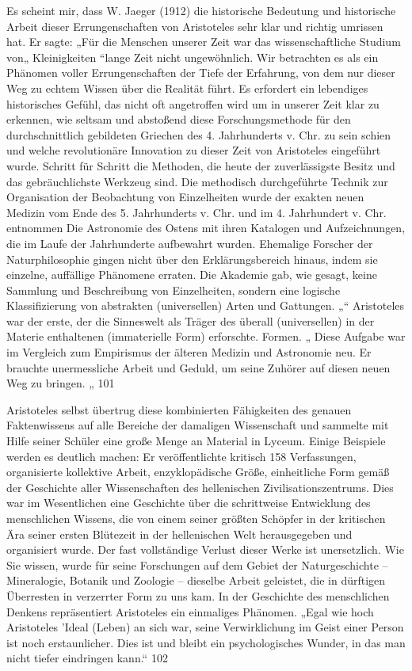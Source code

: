 \documentclass[11pt,a4paper]{book}
\begin{document}
Es scheint mir, dass W. Jaeger (1912) die historische Bedeutung und historische Arbeit dieser Errungenschaften von Aristoteles sehr klar und richtig umrissen hat. Er sagte: „Für die Menschen unserer Zeit war das wissenschaftliche Studium von„ Kleinigkeiten “lange Zeit nicht ungewöhnlich. Wir betrachten es als ein Phänomen voller Errungenschaften der Tiefe der Erfahrung, von dem nur dieser Weg zu echtem Wissen über die Realität führt. Es erfordert ein lebendiges historisches Gefühl, das nicht oft angetroffen wird um in unserer Zeit klar zu erkennen, wie seltsam und abstoßend diese Forschungsmethode für den durchschnittlich gebildeten Griechen des 4. Jahrhunderts v. Chr. zu sein schien und welche revolutionäre Innovation zu dieser Zeit von Aristoteles eingeführt wurde. Schritt für Schritt die Methoden, die heute der zuverlässigste Besitz und das gebräuchlichste Werkzeug sind. Die methodisch durchgeführte Technik zur Organisation der Beobachtung von Einzelheiten wurde der exakten neuen Medizin vom Ende des 5. Jahrhunderts v. Chr. und im 4. Jahrhundert v. Chr. entnommen Die Astronomie des Ostens mit ihren Katalogen und Aufzeichnungen, die im Laufe der Jahrhunderte aufbewahrt wurden. Ehemalige Forscher der Naturphilosophie gingen nicht über den Erklärungsbereich hinaus, indem sie einzelne, auffällige Phänomene erraten. Die Akademie gab, wie gesagt, keine Sammlung und Beschreibung von Einzelheiten, sondern eine logische Klassifizierung von abstrakten (universellen) Arten und Gattungen. „“ Aristoteles war der erste, der die Sinneswelt als Träger des überall (universellen) in der Materie enthaltenen (immaterielle Form) erforschte. Formen. „ Diese Aufgabe war im Vergleich zum Empirismus der älteren Medizin und Astronomie neu. Er brauchte unermessliche Arbeit und Geduld, um seine Zuhörer auf diesen neuen Weg zu bringen. „ 101



Aristoteles selbst übertrug diese kombinierten Fähigkeiten des genauen Faktenwissens auf alle Bereiche der damaligen Wissenschaft und sammelte mit Hilfe seiner Schüler eine große Menge an Material in Lyceum. Einige Beispiele werden es deutlich machen: Er veröffentlichte kritisch 158 Verfassungen, organisierte kollektive Arbeit, enzyklopädische Größe, einheitliche Form gemäß der Geschichte aller Wissenschaften des hellenischen Zivilisationszentrums. Dies war im Wesentlichen eine Geschichte über die schrittweise Entwicklung des menschlichen Wissens, die von einem seiner größten Schöpfer in der kritischen Ära seiner ersten Blütezeit in der hellenischen Welt herausgegeben und organisiert wurde. Der fast vollständige Verlust dieser Werke ist unersetzlich. Wie Sie wissen, wurde für seine Forschungen auf dem Gebiet der Naturgeschichte -- Mineralogie, Botanik und Zoologie -- dieselbe Arbeit geleistet, die in dürftigen Überresten in verzerrter Form zu uns kam. In der Geschichte des menschlichen Denkens repräsentiert Aristoteles ein einmaliges Phänomen. „Egal wie hoch Aristoteles 'Ideal (Leben) an sich war, seine Verwirklichung im Geist einer Person ist noch erstaunlicher. Dies ist und bleibt ein psychologisches Wunder, in das man nicht tiefer eindringen kann.“ 102
\end{document}
